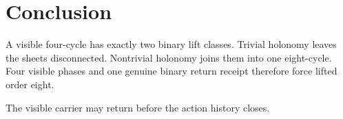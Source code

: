 \section{Conclusion}

A visible four-cycle has exactly two binary lift classes. Trivial
holonomy leaves the sheets disconnected. Nontrivial holonomy joins
them into one eight-cycle. Four visible phases and one genuine binary
return receipt therefore force lifted order eight.

The visible carrier may return before the action history closes.
